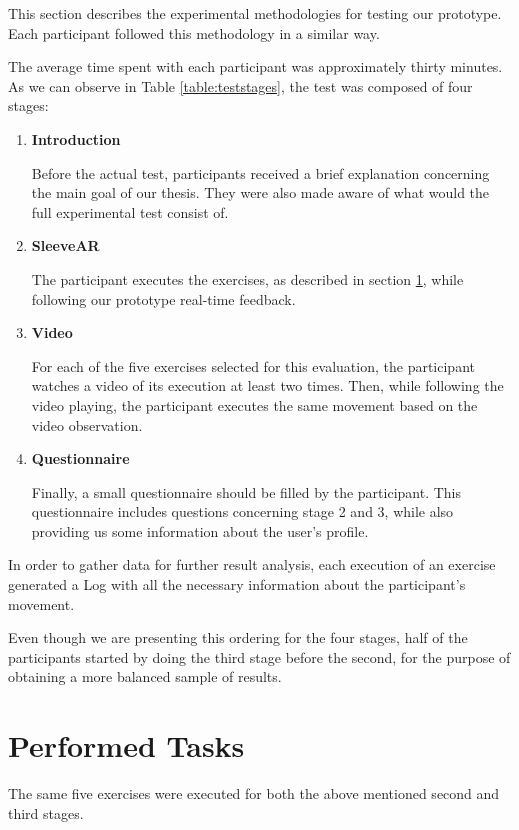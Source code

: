 This section describes the experimental methodologies for testing our prototype. Each participant followed this methodology in a similar way.

The average time spent with each participant was approximately thirty minutes. As we can observe in Table \ref{table:teststages}, the test was composed of four stages:

\begin{enumerate}
\item \textbf{Introduction}

Before the actual test, participants received a brief explanation concerning the main goal of our thesis. They were also made aware of what would the full experimental test consist of.

\item \textbf{SleeveAR}

The participant executes the exercises, as described in section \ref{evaluation-tasks}, while following our prototype real-time feedback.

\item \textbf{Video}

For each of the five exercises selected for this evaluation, the participant  watches a video of its execution at least two times. Then, while following the video playing, the participant executes the same movement based on the video observation.

\item \textbf{Questionnaire}

Finally, a small questionnaire should be filled by the participant. This questionnaire includes questions concerning stage 2 and 3, while also providing us some information about the user's profile.


\end{enumerate}

In order to gather data for further result analysis, each execution of an exercise generated a Log with all the necessary information about the participant's movement. 

Even though we are presenting this ordering for the four stages, half of the participants started by doing the third stage before the second, for the purpose of obtaining a more balanced sample of results.

\section{Performed Tasks} \label{evaluation-tasks}
The same five exercises were executed for both the above mentioned second and third stages.

